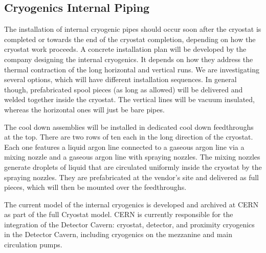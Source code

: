 
\subsection{Cryogenics Internal Piping}
\label{sec:fdgen-slow-cryo-install-pipes}


The installation of internal cryogenic pipes should occur soon after the cryostat is completed or towards the end of the cryostat completion, depending on how the cryostat work proceeds. A concrete installation plan will be developed by the company designing the internal cryogenics. It depends on how they address the thermal contraction of the long horizontal and vertical runs. We are investigating several options, which will have different installation sequences. In general though, prefabricated spool pieces (as long as allowed) will be delivered and welded together inside the cryostat. The vertical lines will be vacuum insulated, whereas the horizontal ones will just be bare pipes.

The cool down assemblies will be installed in dedicated cool down feedthroughs at the top. There are two rows of ten each in the long direction of the cryostat. Each one features a liquid argon line connected to a gaseous argon line via a mixing nozzle and a gaseous argon line with spraying nozzles. The mixing nozzles generate droplets of liquid that are circulated uniformly inside the cryostat by the spraying nozzles. They are prefabricated at the vendor's site and delivered as full pieces, which will then be mounted over the feedthroughs.

The current \threed model of the internal cryogenics is developed and archived at CERN as part of the full Cryostat model. CERN is currently responsible for the integration of the Detector Cavern: cryostat, detector, and proximity cryogenics in the Detector Cavern, including cryogenics on the mezzanine and main \lar circulation pumps.

